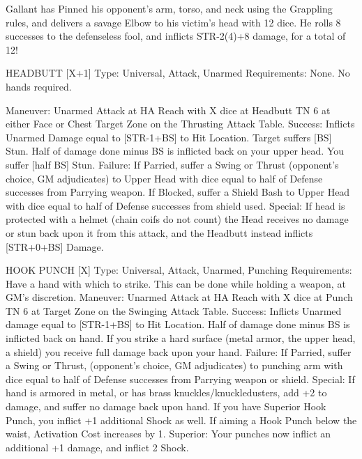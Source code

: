 \documentclass[oneside,11pt,english]{book}
\begin{document}
 

Gallant has Pinned his opponent’s arm, torso, and neck using the Grappling rules, and delivers a savage Elbow to his victim’s 
head with 12 dice. He rolls 8 successes to the defenseless fool, and inflicts STR-2(4)+8 damage, for a total of 12! 
 
HEADBUTT [X+1] 
Type: Universal, Attack, Unarmed 
Requirements: None. No hands required. 


Maneuver: Unarmed Attack at HA Reach with X dice at Headbutt TN 6 at either Face or Chest Target 
Zone on the Thrusting Attack Table. 
Success: Inflicts Unarmed Damage equal to [STR-1+BS] to Hit Location. Target suffers [BS] Stun. Half 
of damage done minus BS is inflicted back on your upper head. You suffer [half BS] Stun. 
Failure: If Parried, suffer a Swing or Thrust (opponent’s choice, GM adjudicates) to Upper Head with 
dice equal to half of Defense successes from Parrying weapon. If Blocked, suffer a Shield Bash to Upper 
Head with dice equal to half of Defense successes from shield used. 
Special: If head is protected with a helmet (chain coifs do not count) the Head receives no damage or stun 
back upon it from this attack, and the Headbutt instead inflicts [STR+0+BS] Damage. 

 

HOOK PUNCH [X] 
Type: Universal, Attack, Unarmed, Punching 
Requirements: Have a hand with which to strike. This can be done while holding a weapon, at GM's 
discretion. 
Maneuver: Unarmed Attack at HA Reach with X dice at Punch TN 6 at Target Zone on the Swinging 
Attack Table. 
Success: Inflicts Unarmed damage equal to [STR-1+BS] to Hit Location. Half of damage done minus BS 
is inflicted back on hand. If you strike a hard surface (metal armor, the upper head, a shield) you receive 
full damage back upon your hand. 
Failure: If Parried, suffer a Swing or Thrust, (opponent’s choice, GM adjudicates) to punching arm with 
dice equal to half of Defense successes from Parrying weapon or shield. 
Special: If hand is armored in metal, or has brass knuckles/knuckledusters, add +2 to damage, and suffer 
no damage back upon hand. If you have Superior Hook Punch, you inflict +1 additional Shock as well. 
If aiming a Hook Punch below the waist, Activation Cost increases by 1. 
Superior: Your punches now inflict an additional +1 damage, and inflict 2 Shock. 

 
\end{document}
